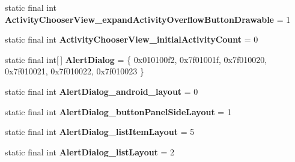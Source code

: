\begin{DoxyCompactItemize}
\item 
\hypertarget{classandroid_1_1support_1_1v7_1_1appcompat_1_1_r_1_1styleable_a57d782294bc85a6841b5827f7d22e221}{}static final int {\bfseries Activity\+Chooser\+View\+\_\+expand\+Activity\+Overflow\+Button\+Drawable} = 1\label{classandroid_1_1support_1_1v7_1_1appcompat_1_1_r_1_1styleable_a57d782294bc85a6841b5827f7d22e221}

\item 
\hypertarget{classandroid_1_1support_1_1v7_1_1appcompat_1_1_r_1_1styleable_af5fce8154e0c1de563d94e6b59316ea8}{}static final int {\bfseries Activity\+Chooser\+View\+\_\+initial\+Activity\+Count} = 0\label{classandroid_1_1support_1_1v7_1_1appcompat_1_1_r_1_1styleable_af5fce8154e0c1de563d94e6b59316ea8}

\item 
\hypertarget{classandroid_1_1support_1_1v7_1_1appcompat_1_1_r_1_1styleable_a52dcd4f818920ef336f5b8033a2b34c1}{}static final int\mbox{[}$\,$\mbox{]} {\bfseries Alert\+Dialog} = \{ 0x010100f2, 0x7f01001f, 0x7f010020, 0x7f010021, 0x7f010022, 0x7f010023 \}\label{classandroid_1_1support_1_1v7_1_1appcompat_1_1_r_1_1styleable_a52dcd4f818920ef336f5b8033a2b34c1}

\item 
\hypertarget{classandroid_1_1support_1_1v7_1_1appcompat_1_1_r_1_1styleable_a3ba92cfe097b7f2eb3bf09db564da66a}{}static final int {\bfseries Alert\+Dialog\+\_\+android\+\_\+layout} = 0\label{classandroid_1_1support_1_1v7_1_1appcompat_1_1_r_1_1styleable_a3ba92cfe097b7f2eb3bf09db564da66a}

\item 
\hypertarget{classandroid_1_1support_1_1v7_1_1appcompat_1_1_r_1_1styleable_ac6cb6a756969c7cd5147564f0e743131}{}static final int {\bfseries Alert\+Dialog\+\_\+button\+Panel\+Side\+Layout} = 1\label{classandroid_1_1support_1_1v7_1_1appcompat_1_1_r_1_1styleable_ac6cb6a756969c7cd5147564f0e743131}

\item 
\hypertarget{classandroid_1_1support_1_1v7_1_1appcompat_1_1_r_1_1styleable_a3d97cbf99f764229526d22f3c734187e}{}static final int {\bfseries Alert\+Dialog\+\_\+list\+Item\+Layout} = 5\label{classandroid_1_1support_1_1v7_1_1appcompat_1_1_r_1_1styleable_a3d97cbf99f764229526d22f3c734187e}

\item 
\hypertarget{classandroid_1_1support_1_1v7_1_1appcompat_1_1_r_1_1styleable_afb0edb41ca6aa8279e7047879a7e31ba}{}static final int {\bfseries Alert\+Dialog\+\_\+list\+Layout} = 2\label{classandroid_1_1support_1_1v7_1_1appcompat_1_1_r_1_1styleable_afb0edb41ca6aa8279e7047879a7e31ba}


\end{DoxyCompactItemize}
